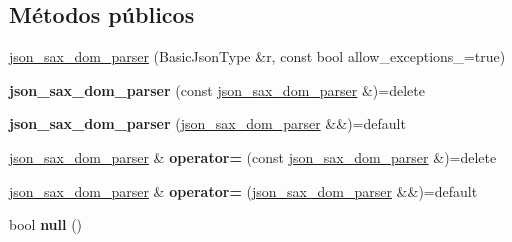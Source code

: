 \subsection*{Métodos públicos}
\begin{DoxyCompactItemize}
\item 
\mbox{\hyperlink{classnlohmann_1_1detail_1_1json__sax__dom__parser_afc50fee0a92ce84afb84041ebbdfba80}{json\+\_\+sax\+\_\+dom\+\_\+parser}} (Basic\+Json\+Type \&r, const bool allow\+\_\+exceptions\+\_\+=true)
\item 
\mbox{\label{classnlohmann_1_1detail_1_1json__sax__dom__parser_a0a00cd158d678e294f6e974cd9373c4b}} 
{\bfseries json\+\_\+sax\+\_\+dom\+\_\+parser} (const \mbox{\hyperlink{classnlohmann_1_1detail_1_1json__sax__dom__parser}{json\+\_\+sax\+\_\+dom\+\_\+parser}} \&)=delete
\item 
\mbox{\label{classnlohmann_1_1detail_1_1json__sax__dom__parser_ad6e588652d5a9cb647a3c32a6221f13e}} 
{\bfseries json\+\_\+sax\+\_\+dom\+\_\+parser} (\mbox{\hyperlink{classnlohmann_1_1detail_1_1json__sax__dom__parser}{json\+\_\+sax\+\_\+dom\+\_\+parser}} \&\&)=default
\item 
\mbox{\label{classnlohmann_1_1detail_1_1json__sax__dom__parser_a98448bf2cbc15d15e2eddc5a09a40a42}} 
\mbox{\hyperlink{classnlohmann_1_1detail_1_1json__sax__dom__parser}{json\+\_\+sax\+\_\+dom\+\_\+parser}} \& {\bfseries operator=} (const \mbox{\hyperlink{classnlohmann_1_1detail_1_1json__sax__dom__parser}{json\+\_\+sax\+\_\+dom\+\_\+parser}} \&)=delete
\item 
\mbox{\label{classnlohmann_1_1detail_1_1json__sax__dom__parser_aff928a07e40e4efb16b3ff9384f4401c}} 
\mbox{\hyperlink{classnlohmann_1_1detail_1_1json__sax__dom__parser}{json\+\_\+sax\+\_\+dom\+\_\+parser}} \& {\bfseries operator=} (\mbox{\hyperlink{classnlohmann_1_1detail_1_1json__sax__dom__parser}{json\+\_\+sax\+\_\+dom\+\_\+parser}} \&\&)=default
\item 
\mbox{\label{classnlohmann_1_1detail_1_1json__sax__dom__parser_abb06babaa861f123d8d0cb443b887d8a}} 
bool {\bfseries null} ()
\item 

\end{DoxyCompactItemize}
